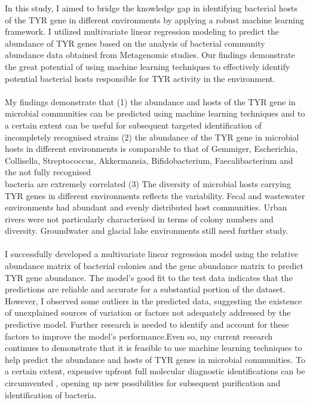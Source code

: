 \documentclass[12pt]{article}
\begin{document}
In this study, I aimed to bridge the knowledge gap in identifying bacterial hosts of the TYR gene in different environments by applying a robust machine learning framework. I utilized multivariate linear regression modeling to predict the abundance of TYR genes based on the analysis of bacterial community abundance data obtained from Metagenomic studies. Our findings demonstrate the great potential of using machine learning techniques to effectively identify potential bacterial hosts responsible for TYR activity in the environment.\\\\
My findings demonstrate that (1) the abundance and hosts of the TYR gene in microbial communities can be predicted using machine learning techniques and to a certain extent can be useful for subsequent targeted identification of incompletely recognised strains (2) the abundance of the TYR gene in microbial hosts in different environments is comparable to that of Gemmiger, Escherichia, Collisella, Streptococcus, Akkermansia, Bifidobacterium, Faecalibacterium and the not fully recognised \\
 bacteria are extremely correlated (3) The diversity of microbial hosts carrying TYR genes in different environments reflects the variability. Fecal and wastewater environments had abundant and evenly distributed host communities. Urban rivers were not particularly characterised in terms of colony numbers and diversity. Groundwater and glacial lake environments still need further study.\\\\
I successfully developed a multivariate linear regression model using the relative abundance matrix of bacterial colonies and the gene abundance matrix to predict TYR gene abundance. The model's good fit to the test data indicates that the predictions are reliable and accurate for a substantial portion of the dataset. However, I observed some outliers in the predicted data, suggesting the existence of unexplained sources of variation or factors not adequately addressed by the predictive model. Further research is needed to identify and account for these factors to improve the model's performance.Even so, my current research continues to demonstrate that it is feasible to use machine learning techniques to help predict the abundance and hosts of TYR genes in microbial communities. To a certain extent, expensive upfront full molecular diagnostic identifications can be circumvented \citep{varadi2017methods}, opening up new possibilities for subsequent purification and identification of bacteria.\\\\
\end{document}

